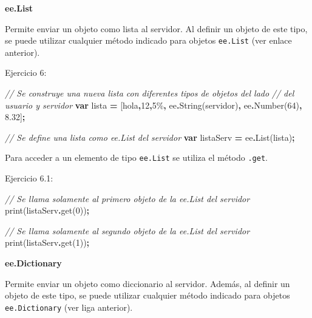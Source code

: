 \documentclass[
  12pt,
  letterpaper,
  twoside]{book}
\newenvironment{Shaded}{\begin{snugshade}}{\end{snugshade}}
\newcommand{\CommentTok}[1]{\textcolor[rgb]{0.56,0.35,0.01}{\textit{#1}}}
\newcommand{\DecValTok}[1]{\textcolor[rgb]{0.00,0.00,0.81}{#1}}
\newcommand{\FloatTok}[1]{\textcolor[rgb]{0.00,0.00,0.81}{#1}}
\newcommand{\FunctionTok}[1]{\textcolor[rgb]{0.00,0.00,0.00}{#1}}
\newcommand{\KeywordTok}[1]{\textcolor[rgb]{0.13,0.29,0.53}{\textbf{#1}}}
\newcommand{\NormalTok}[1]{#1}
\newcommand{\OperatorTok}[1]{\textcolor[rgb]{0.81,0.36,0.00}{\textbf{#1}}}
\newcommand{\StringTok}[1]{\textcolor[rgb]{0.31,0.60,0.02}{#1}}
\begin{document}
\textbf{ee.List}

Permite enviar un objeto como lista al servidor. Al definir un objeto de este tipo, se puede utilizar cualquier método indicado para objetos \texttt{ee.List} (ver enlace anterior).

Ejercicio 6:

\begin{Shaded}
\begin{Highlighting}[]
\CommentTok{// Se construye una nueva lista con diferentes tipos de objetos del lado }
\CommentTok{// del usuario y servidor}
\KeywordTok{var}\NormalTok{ lista }\OperatorTok{=}\NormalTok{ [}\StringTok{\textquotesingle{}hola\textquotesingle{}}\OperatorTok{,}\StringTok{\textquotesingle{}12\textquotesingle{}}\OperatorTok{,}\StringTok{\textquotesingle{}5\%\textquotesingle{}}\OperatorTok{,}\NormalTok{ ee}\OperatorTok{.}\FunctionTok{String}\NormalTok{(}\StringTok{\textquotesingle{}servidor\textquotesingle{}}\NormalTok{)}\OperatorTok{,}\NormalTok{ ee}\OperatorTok{.}\FunctionTok{Number}\NormalTok{(}\DecValTok{64}\NormalTok{)}\OperatorTok{,} \FloatTok{8.32}\NormalTok{]}\OperatorTok{;}

\CommentTok{// Se define una lista como ee.List del servidor }
\KeywordTok{var}\NormalTok{ listaServ }\OperatorTok{=}\NormalTok{ ee}\OperatorTok{.}\FunctionTok{List}\NormalTok{(lista)}\OperatorTok{;}             
\end{Highlighting}
\end{Shaded}

Para acceder a un elemento de tipo \texttt{ee.List} se utiliza el método \texttt{.get}.

Ejercicio 6.1:

\begin{Shaded}
\begin{Highlighting}[]
\CommentTok{// Se llama solamente al primero objeto de la ee.List del servidor}
\FunctionTok{print}\NormalTok{(listaServ}\OperatorTok{.}\FunctionTok{get}\NormalTok{(}\DecValTok{0}\NormalTok{))}\OperatorTok{;}   

\CommentTok{// Se llama solamente al segundo objeto de la ee.List del servidor}
\FunctionTok{print}\NormalTok{(listaServ}\OperatorTok{.}\FunctionTok{get}\NormalTok{(}\DecValTok{1}\NormalTok{))}\OperatorTok{;} 
\end{Highlighting}
\end{Shaded}

\textbf{ee.Dictionary}

Permite enviar un objeto como diccionario al servidor. Además, al definir un objeto de este tipo, se puede utilizar cualquier método indicado para objetos \texttt{ee.Dictionary} (ver liga anterior).
\end{document}
